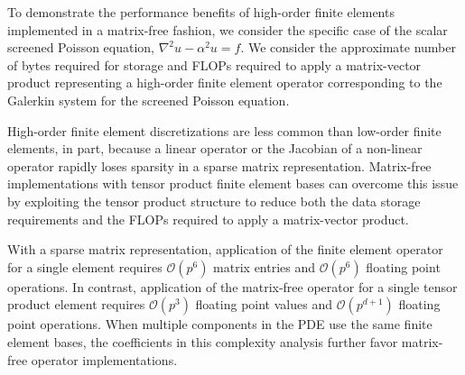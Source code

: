 To demonstrate the performance benefits of high-order finite elements implemented in a matrix-free fashion, we consider the specific case of the scalar screened Poisson equation, $\nabla^2 u - \alpha^2 u = f$.
We consider the approximate number of bytes required for storage and FLOPs required to apply a matrix-vector product representing a high-order finite element operator corresponding to the Galerkin system for the screened Poisson equation.

High-order finite element discretizations are less common than low-order finite elements, in part, because a linear operator or the Jacobian of a non-linear operator rapidly loses sparsity in a sparse matrix representation.
Matrix-free implementations with tensor product finite element bases can overcome this issue by exploiting the tensor product structure to reduce both the data storage requirements and the FLOPs required to apply a matrix-vector product.

With a sparse matrix representation, application of the finite element operator for a single element requires $\mathcal{O} \left( p^6 \right)$ matrix entries and $\mathcal{O} \left( p^6 \right)$ floating point operations.
In contrast, application of the matrix-free operator for a single tensor product element requires $\mathcal{O} \left( p^3 \right)$ floating point values and $\mathcal{O} \left( p^{d + 1} \right)$ floating point operations.
When multiple components in the PDE use the same finite element bases, the coefficients in this complexity analysis further favor matrix-free operator implementations.


